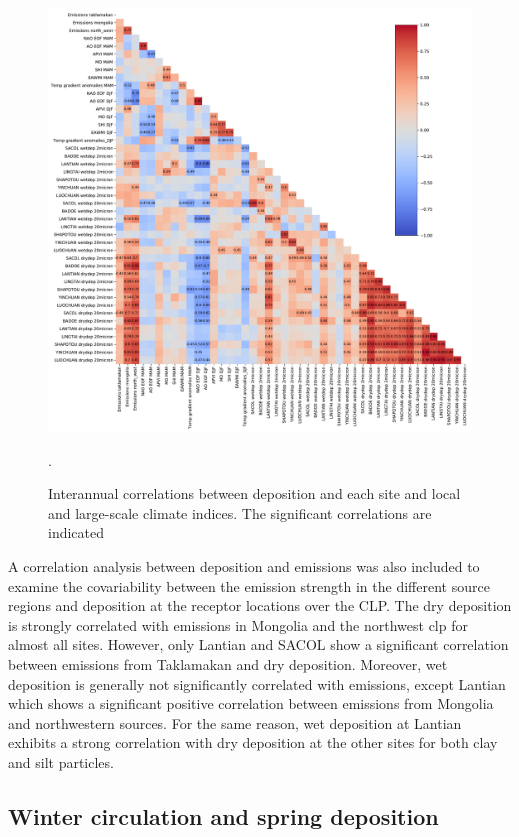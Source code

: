 \begin{figure}[htpb]
    \centering
    \includegraphics[width=\textwidth]{texfiles/figs/correlations.pdf}
    \caption{Interannual correlations between deposition and each site and local and large-scale climate indices. The significant correlations are indicated}.
    \label{fig:correlations}
\end{figure}

A correlation analysis between deposition and emissions was also included to examine the covariability between the emission strength in the different source regions and deposition at the receptor locations over the CLP. 
The dry deposition is strongly correlated with emissions in Mongolia and the northwest \acrshort{clp} for almost all sites. However, only Lantian and SACOL show a significant correlation between emissions from Taklamakan and dry deposition. 
Moreover, wet deposition is generally not significantly correlated with emissions, except Lantian which shows a significant positive correlation between emissions from Mongolia and northwestern sources. For the same reason, wet deposition at Lantian exhibits a strong correlation with dry deposition at the other sites for both clay and silt particles.  

\subsection{Winter circulation and spring deposition}

